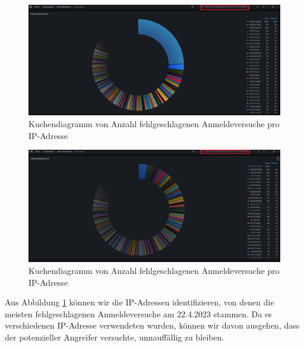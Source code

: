 \newpage
{}
\thispagestyle{lscape}
\begin{landscape}
    \begin{figure}[H]
        \centerline{\includegraphics[width=1.6\textwidth]{assets/Failed_pro_ip.png}}
        \caption[Kuchendiagramm von Anzahl fehlgeschlagenen Anmeldeversuche pro IP-Adresse]
        {Kuchendiagramm von Anzahl fehlgeschlagenen Anmeldeversuche pro IP-Adresse}
        \label{fig:1_Anmeldung_IPAdresse}
        \centering
    \end{figure}
\end{landscape}
\restoregeometry

\newpage
{}
\thispagestyle{lscape}
\begin{landscape}
    \begin{figure}[H]
        \centerline{\includegraphics[width=1.6\textwidth]{assets/Failed_pro_ip2.png}}
        \caption[Kuchendiagramm von Anzahl fehlgeschlagenen Anmeldeversuche pro IP-Adresse]
        {Kuchendiagramm von Anzahl fehlgeschlagenen Anmeldeversuche pro IP-Adresse}
        \label{fig:1_Anmeldung_IPAdresseOhne194}
        \centering
    \end{figure}
\end{landscape}
\restoregeometry

Aus Abbildung \ref{fig:1_Anmeldung_IPAdresse} können wir die IP-Adressen identifizieren, von denen die meisten fehlgeschlagenen Anmeldeversuche am 22.4.2023 stammen. Da es verschiedenen IP-Adresse verwendeten wurden, können wir davon ausgehen, dass der potenzieller Angreifer versuchte, unnauffällig zu bleiben. 

